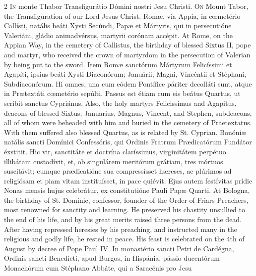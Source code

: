 \begin{paracol}{2}
\lettrine[lines=2]{I}{n} monte Thabor 
 Transfigurátio Dómini nostri Jesu Christi.
\switchcolumn
{}
\lettrine[lines=2]{O}{n} Mount Tabor, the Transfiguration 
 of our Lord Jesus Christ.
\switchcolumn*
{}
Romæ, via Appia, in 
 cœmetério Callísti, natális beáti Xysti Secúndi, Papæ et Mártyris, qui in 
 persecutióne Valeriáni, gládio animadvérsus, martyrii corónam accépit.
\switchcolumn
{}
At Rome, on the Appian Way, in the 
 cemetery of Callistus, the birthday of blessed Sixtus II, pope and martyr, 
 who received the crown of martyrdom in the persecution of Valerian by being 
 put to the sword.
\switchcolumn*
{}
Item Romæ sanctórum 
 Mártyrum Felicíssimi et Agapíti, ipsíus beáti Xysti Diaconórum; Januárii, 
 Magni, Vincéntii et Stéphani, Subdiaconórum. Hi omnes, una cum eódem 
 Pontífice páriter decolláti sunt, atque in Prætextáti cœmetério sepúlti. 
 Passus est étiam cum eis beátus Quartus, ut scribit sanctus Cypriánus.
\switchcolumn
{}
Also, the holy martyrs Felicissimus 
 and Agapitus, deacons of blessed Sixtus; Januarius, Magnus, Vincent, and 
 Stephen, subdeacons, all of whom were beheaded with him and buried in the 
 cemetery of Praetextatus. With them suffered also blessed Quartus, as 
 is related by St. Cyprian.
\switchcolumn*
{}
Bonóniæ natális sancti 
 Domínici Confessóris, qui Ordinis Fratrum Prædicatórum Fundátor éxstitit. 
 Hic vir, sanctitáte et doctrína claríssimus, virginitátem perpétuo illibátam 
 custodívit, et, ob singulárem meritórum grátiam, tres mórtuos suscitávit; cumque prædicatióne sua compressísset hæreses, ac plúrimos ad religiósam et 
 piam vitam instituísset, in pace quiévit. Ejus autem festívitas prídie 
 Nonas mensis hujus celebrátur, ex constitutióne Pauli Papæ Quarti.
\switchcolumn
{}
At Bologna, the birthday of St. 
 Dominic, confessor, founder of the Order of Friars Preachers, most renowned 
 for sanctity and learning. He preserved his chastity unsullied to the 
 end of his life, and by his great merits raised three persons from the dead. 
 After having repressed heresies by his preaching, and instructed many in the 
 religious and godly life, he rested in peace. His feast is celebrated 
 on the 4th of August by decree of Pope Paul IV.
\switchcolumn*
{}
In monastério sancti 
 Petri de Cardégna, Ordinis sancti Benedícti, apud Burgos, in Hispánia, 
 pássio ducentórum Monachórum cum Stéphano Abbáte, qui a Saracénis pro Jesu 

\end{paracol}
